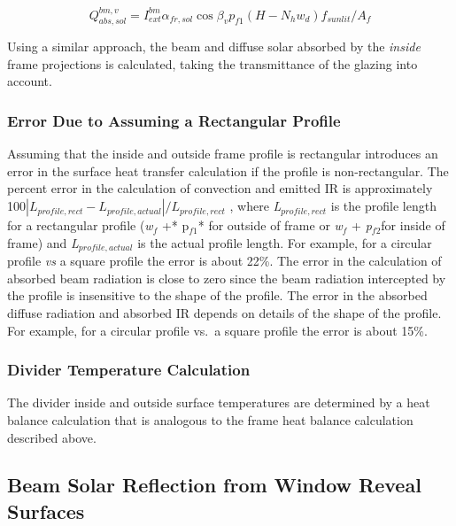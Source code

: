 \begin{equation}
Q_{abs,sol}^{bm,v} = I_{ext}^{bm}{\alpha_{fr,sol}}\cos {\beta_v}{p_{f1}}\left( {H - {N_h}{w_d}} \right){f_{sunlit}}/{A_f}
\end{equation}

Using a similar approach, the beam and diffuse solar absorbed by the \emph{inside} frame projections is calculated, taking the transmittance of the glazing into account.

\subsubsection{Error Due to Assuming a Rectangular Profile}\label{error-due-to-assuming-a-rectangular-profile}

Assuming that the inside and outside frame profile is rectangular introduces an error in the surface heat transfer calculation if the profile is non-rectangular. The percent error in the calculation of convection and emitted IR is approximately 100\(\left| {{L_{profile,rect}} - {L_{profile,actual}}} \right|/{L_{profile,rect}}\) , where \emph{L\(_{profile,rect}\)} is the profile length for a rectangular profile (\emph{w\(_{f}\)} +* p\(_{f1}\)* for outside of frame or \emph{w\(_{f}\)} + \emph{p\(_{f2}\)}for inside of frame) and \emph{L\(_{profile,actual}\)} is the actual profile length. For example, for a circular profile \emph{vs} a square profile the error is about 22\%. The error in the calculation of absorbed beam radiation is close to zero since the beam radiation intercepted by the profile is insensitive to the shape of the profile. The error in the absorbed diffuse radiation and absorbed IR depends on details of the shape of the profile. For example, for a circular profile vs.~a square profile the error is about 15\%.

\subsubsection{Divider Temperature Calculation}\label{divider-temperature-calculation}

The divider inside and outside surface temperatures are determined by a heat balance calculation that is analogous to the frame heat balance calculation described above.

\subsection{Beam Solar Reflection from Window Reveal Surfaces}\label{beam-solar-reflection-from-window-reveal-surfaces}

